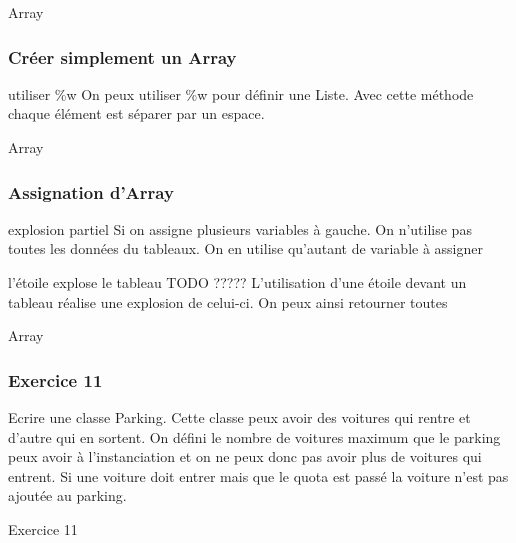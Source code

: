 \documentclass{beamer}
\begin{document}
\begin{frame}
  \begin{beamerboxesrounded}{Array}
    
  \end{beamerboxesrounded}
\end{frame}

\begin{frame}
  \frametitle{Cr\'eer simplement un Array}
  \begin{block}{utiliser \%w}
    On peux utiliser \%w pour d\'efinir une Liste. Avec cette m\'ethode
    chaque \'el\'ement est s\'eparer par un espace.
  \end{block}
\end{frame}

\begin{frame}
  \begin{beamerboxesrounded}{Array}
    
  \end{beamerboxesrounded}
\end{frame}

\begin{frame}
  \frametitle{Assignation d'Array}
  \begin{block}{explosion partiel}
    Si on assigne plusieurs variables à gauche. On n'utilise pas toutes les donn\'ees
    du tableaux. On en utilise qu'autant de variable à assigner
  \end{block}
  \begin{block}{l'\'etoile explose le tableau}
    TODO
    ?????
    L'utilisation d'une \'etoile devant un tableau r\'ealise une explosion de celui-ci.
    On peux ainsi retourner toutes
  \end{block}
\end{frame}

\begin{frame}
  \begin{beamerboxesrounded}{Array}
    
  \end{beamerboxesrounded}
\end{frame}


\begin{frame}
  \frametitle{Exercice 11}
  Ecrire une classe Parking. Cette classe peux avoir des voitures qui rentre
  et d'autre qui en sortent. On d\'efini le nombre de voitures maximum que le parking
  peux avoir à l'instanciation et on ne peux donc pas avoir plus de voitures qui entrent.
  Si une voiture doit entrer mais que le quota est pass\'e la voiture n'est pas ajout\'ee au
  parking.
\end{frame}
\begin{frame}
  \begin{beamerboxesrounded}{Exercice 11}
    
  \end{beamerboxesrounded}
\end{frame}
\end{document}
